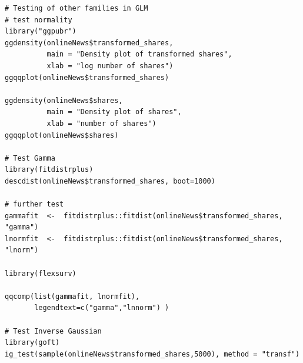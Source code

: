 \documentclass[letterpaper,12pt]{article}
\begin{document}
\begin{lstlisting}
# Testing of other families in GLM
# test normality
library("ggpubr")
ggdensity(onlineNews$transformed_shares, 
          main = "Density plot of transformed shares",
          xlab = "log number of shares")
ggqqplot(onlineNews$transformed_shares)

ggdensity(onlineNews$shares, 
          main = "Density plot of shares",
          xlab = "number of shares")
ggqqplot(onlineNews$shares)

# Test Gamma
library(fitdistrplus)
descdist(onlineNews$transformed_shares, boot=1000)

# further test
gammafit  <-  fitdistrplus::fitdist(onlineNews$transformed_shares, "gamma")
lnormfit  <-  fitdistrplus::fitdist(onlineNews$transformed_shares, "lnorm")  

library(flexsurv) 

qqcomp(list(gammafit, lnormfit),
       legendtext=c("gamma","lnnorm") )
       
# Test Inverse Gaussian
library(goft)
ig_test(sample(onlineNews$transformed_shares,5000), method = "transf")
\end{lstlisting}
\end{document}
